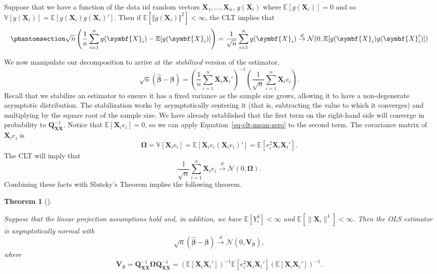 \documentclass[
  13pt,
  letterpaper,
  DIV=11,
  numbers=noendperiod]{scrreprt}
\newcommand{\mb}{\symbf}
\newcommand{\E}{\mathbb{E}}
\newcommand{\V}{\mathbb{V}}
\newcommand{\N}{\mathcal{N}}
\newcommand{\X}{\mb{X}}
\newcommand{\bfbeta}{\mb{\beta}}
\newcommand{\bhat}{\widehat{\mb{\beta}}}
\newcommand{\indist}{\overset{d}{\to}}
\theoremstyle{definition}
\theoremstyle{definition}
\theoremstyle{plain}
\newtheorem{theorem}{Theorem}[chapter]
\theoremstyle{remark}
\begin{document}
\begin{tcolorbox}[enhanced jigsaw, leftrule=.75mm, colbacktitle=quarto-callout-note-color!10!white, title=\textcolor{quarto-callout-note-color}{\faInfo}\hspace{0.5em}{CLT reminder}, toptitle=1mm, breakable, left=2mm, toprule=.15mm, arc=.35mm, opacitybacktitle=0.6, opacityback=0, colback=white, rightrule=.15mm, titlerule=0mm, colframe=quarto-callout-note-color-frame, bottomtitle=1mm, bottomrule=.15mm, coltitle=black]

Suppose that we have a function of the data iid random vectors
\(\X_1, \ldots, \X_n\), \(g(\X_{i})\) where \(\E[g(\X_{i})] = 0\) and so
\(\V[g(\X_{i})] = \E[g(\X_{i})g(\X_{i})']\). Then if
\(\E[\Vert g(\X_{i})\Vert^{2}] < \infty\), the CLT implies that
\begin{equation}\phantomsection\label{eq-clt-mean-zero}{ 
\sqrt{n}\left(\frac{1}{n} \sum_{i=1}^{n} g(\X_{i}) - \E[g(\X_{i})]\right) = \frac{1}{\sqrt{n}} \sum_{i=1}^{n} g(\X_{i}) \indist \N(0, \E[g(\X_{i})g(\X_{i}')]) 
}\end{equation}

\end{tcolorbox}

We now manipulate our decomposition to arrive at the \emph{stabilized}
version of the estimator, \[ 
\sqrt{n}\left( \bhat - \bfbeta\right) = \left( \frac{1}{n} \sum_{i=1}^n \X_i\X_i' \right)^{-1} \left( \frac{1}{\sqrt{n}} \sum_{i=1}^n \X_ie_i \right).
\] Recall that we stabilize an estimator to ensure it has a fixed
variance as the sample size grows, allowing it to have a non-degenerate
asymptotic distribution. The stabilization works by asymptotically
centering it (that is, subtracting the value to which it converges) and
multiplying by the square root of the sample size. We have already
established that the first term on the right-hand side will converge in
probability to \(\mb{Q}_{\X\X}^{-1}\). Notice that
\(\E[\X_{i}e_{i}] = 0\), so we can apply Equation~\ref{eq-clt-mean-zero}
to the second term. The covariance matrix of \(\X_ie_{i}\) is \[ 
\mb{\Omega} = \V[\X_{i}e_{i}] = \E[\X_{i}e_{i}(\X_{i}e_{i})'] = \E[e_{i}^{2}\X_{i}\X_{i}'].
\] The CLT will imply that \[ 
\frac{1}{\sqrt{n}} \sum_{i=1}^n \X_ie_i \indist \N(0, \mb{\Omega}).
\] Combining these facts with Slutsky's Theorem implies the following
theorem.

\begin{theorem}[]\protect\hypertarget{thm-ols-asymptotic-normality}{}\label{thm-ols-asymptotic-normality}

Suppose that the linear projection assumptions hold and, in addition, we
have \(\E[Y_{i}^{4}] < \infty\) and
\(\E[\lVert\X_{i}\rVert^{4}] < \infty\). Then the OLS estimator is
asymptotically normal with \[ 
\sqrt{n}\left( \bhat - \bfbeta\right) \indist \N(0, \mb{V}_{\bfbeta}),
\] where \[ 
\mb{V}_{\bfbeta} = \mb{Q}_{\X\X}^{-1}\mb{\Omega}\mb{Q}_{\X\X}^{-1} = \left( \E[\X_i\X_i'] \right)^{-1}\E[e_i^2\X_i\X_i']\left( \E[\X_i\X_i'] \right)^{-1}.
\]

\end{theorem}
\end{document}
